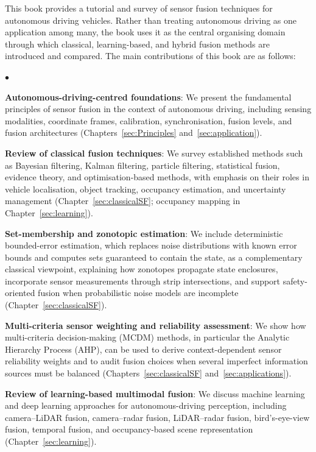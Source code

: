 \documentclass[graybox,envcountchap]{style/SNmono}
\newenvironment{list4a}{
  \begin{list}{$\bullet$}{
      \setlength{\itemsep}{0.05cm}
      \setlength{\labelsep}{0.2cm}
      \setlength{\labelwidth}{0.3cm}
      \setlength{\parsep}{0in}
      \setlength{\parskip}{0in}
      \setlength{\topsep}{0in}
      \setlength{\partopsep}{0in}
      \setlength{\leftmargin}{0.16in}}}
      {\end{list}}
\begin{document}
This book provides a tutorial and survey of sensor fusion techniques for autonomous driving vehicles. Rather than treating autonomous driving as one application among many, the book uses it as the central organising domain through which classical, learning-based, and hybrid fusion methods are introduced and compared. The main contributions of this book are as follows:
\begin{list4a}
    \item \textbf{Autonomous-driving-centred foundations}: We present the fundamental principles of sensor fusion in the context of autonomous driving, including sensing modalities, coordinate frames, calibration, synchronisation, fusion levels, and fusion architectures (Chapters~\ref{sec:Principles} and~\ref{sec:application}).
    \item \textbf{Review of classical fusion techniques}: We survey established methods such as Bayesian filtering, Kalman filtering, particle filtering, statistical fusion, evidence theory, and optimisation-based methods, with emphasis on their roles in vehicle localisation, object tracking, occupancy estimation, and uncertainty management (Chapter~\ref{sec:classicalSF}; occupancy mapping in Chapter~\ref{sec:learning}).
    \item \textbf{Set-membership and zonotopic estimation}: We include deterministic bounded-error estimation, which replaces noise distributions with known error bounds and computes sets guaranteed to contain the state, as a complementary classical viewpoint, explaining how zonotopes propagate state enclosures, incorporate sensor measurements through strip intersections, and support safety-oriented fusion when probabilistic noise models are incomplete (Chapter~\ref{sec:classicalSF}).
    \item \textbf{Multi-criteria sensor weighting and reliability assessment}: We show how multi-criteria decision-making (MCDM) methods, in particular the Analytic Hierarchy Process (AHP), can be used to derive context-dependent sensor reliability weights and to audit fusion choices when several imperfect information sources must be balanced (Chapters~\ref{sec:classicalSF} and~\ref{sec:applications}).
    \item \textbf{Review of learning-based multimodal fusion}: We discuss machine learning and deep learning approaches for autonomous-driving perception, including camera--LiDAR fusion, camera--radar fusion, LiDAR--radar fusion, bird's-eye-view fusion, temporal fusion, and occupancy-based scene representation (Chapter~\ref{sec:learning}).

\end{list4a}
\end{document}
